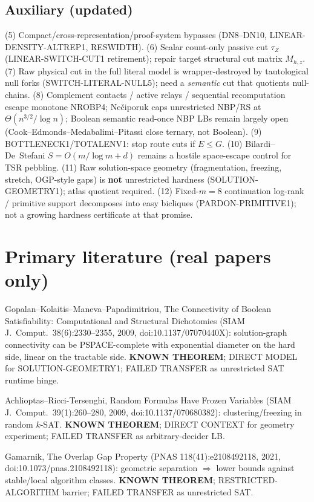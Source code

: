 \documentclass[11pt]{article}
\begin{document}
\subsection*{Auxiliary (updated)}
(5) Compact/cross-representation/proof-system bypasses (DN8--DN10, LINEAR-DENSITY-ALTREP1, RESWIDTH).
(6) Scalar count-only passive cut $\tau_Z$ (LINEAR-SWITCH-CUT1 retirement); repair target
structural cut matrix $M_{h,z}$.
(7) Raw physical cut in the full literal model is wrapper-destroyed by tautological
null forks (SWITCH-LITERAL-NULL5); need a \emph{semantic} cut that quotients null-chains.
(8) Complement contacts / active relays / sequential recomputation escape monotone NROBP4;
Ne\v{c}iporuk caps unrestricted NBP/RS at $\Theta(n^{3/2}/\log n)$; Boolean semantic
read-once NBP LBs remain largely open (Cook--Edmonds--Medabalimi--Pitassi
close ternary, not Boolean).
(9) BOTTLENECK1/TOTALENV1: stop route cuts if $E\le G$.
(10) Bilardi--De~Stefani $S=O(m/\log m+d)$ remains a hostile space-escape control for TSR pebbling.
(11) Raw solution-space geometry (fragmentation, freezing, stretch, OGP-style gaps) is
\textbf{not} unrestricted hardness (SOLUTION-GEOMETRY1); atlas quotient required.
(12) Fixed-$m=8$ continuation log-rank / primitive support decomposes into easy bicliques
(PARDON-PRIMITIVE1); not a growing hardness certificate at that promise.

\section*{Primary literature (real papers only)}
Gopalan--Kolaitis--Maneva--Papadimitriou, The Connectivity of Boolean Satisfiability:
Computational and Structural Dichotomies (SIAM J.\ Comput.\ 38(6):2330--2355, 2009,
doi:10.1137/07070440X): solution-graph connectivity can be PSPACE-complete with
exponential diameter on the hard side, linear on the tractable side.
\textbf{KNOWN THEOREM}; DIRECT MODEL for SOLUTION-GEOMETRY1; FAILED TRANSFER as
unrestricted SAT runtime hinge.

Achlioptas--Ricci-Tersenghi, Random Formulas Have Frozen Variables
(SIAM J.\ Comput.\ 39(1):260--280, 2009, doi:10.1137/070680382):
clustering/freezing in random $k$-SAT. \textbf{KNOWN THEOREM}; DIRECT CONTEXT for
geometry experiment; FAILED TRANSFER as arbitrary-decider LB.

Gamarnik, The Overlap Gap Property (PNAS 118(41):e2108492118, 2021,
doi:10.1073/pnas.2108492118): geometric separation $\Rightarrow$ lower bounds against
stable/local algorithm classes. \textbf{KNOWN THEOREM}; RESTRICTED-ALGORITHM barrier;
FAILED TRANSFER as unrestricted SAT.
\end{document}
